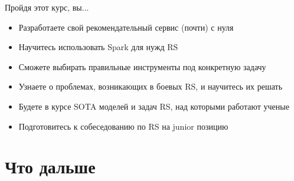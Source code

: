 \documentclass[11pt,aspectratio=169,handout]{beamer}
\begin{document}
\begin{frame}{Пройдя этот курс, вы...}

\begin{itemize}
\item Разработаете свой рекомендательный сервис (почти) с нуля
\item Научитесь использовать Spark для нужд RS
\item Сможете выбирать правильные инструменты под конкретную задачу
\item Узнаете о проблемах, возникающих в боевых RS, и научитесь их решать
\item Будете в курсе SOTA моделей и задач RS, над которыми работают ученые
\item Подготовитесь к собеседованию по RS на junior позицию
\end{itemize}

\end{frame}

{
\begin{frame}[plain]
\end{frame}
}

\section{Что дальше}
\end{document}
